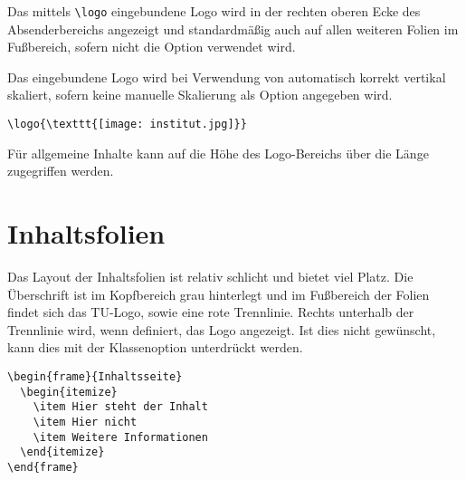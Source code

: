 Das mittels \lstinline{\logo} eingebundene Logo wird in der rechten oberen
Ecke des Absenderbereichs angezeigt und standardmäßig auch auf allen weiteren
Folien im Fußbereich, sofern nicht die Option 
verwendet wird.

Das eingebundene Logo wird bei Verwendung von 
automatisch korrekt vertikal skaliert,
sofern keine manuelle Skalierung als Option angegeben wird.


\begin{example}
\begin{lstlisting}
\logo{\texttt{[image: institut.jpg]}}
\end{lstlisting}
\end{example}

\begin{Declaration}
\end{Declaration}

Für allgemeine Inhalte kann auf die Höhe des Logo-Bereichs über die Länge
 zugegriffen werden.


\section{Inhaltsfolien}

Das Layout der Inhaltsfolien ist relativ schlicht und bietet viel Platz.
Die Überschrift ist im Kopfbereich grau hinterlegt und im Fußbereich der Folien
findet sich das TU-Logo, sowie eine rote Trennlinie.
Rechts unterhalb der Trennlinie wird, wenn definiert, das Logo angezeigt.
Ist dies nicht gewünscht, kann dies mit der Klassenoption
 unterdrückt werden.

\begin{minipage}{0.5\textwidth}
\begin{verbatim}
\begin{frame}{Inhaltsseite}
  \begin{itemize}
    \item Hier steht der Inhalt
    \item Hier nicht
    \item Weitere Informationen
  \end{itemize}
\end{frame}
\end{verbatim}
\end{minipage}
\begin{minipage}{0.5\textwidth}
\end{minipage}

